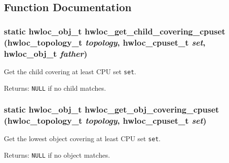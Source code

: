 \subsection{Function Documentation}
\hypertarget{group__hwlocality__helper__find__covering_ge5124e202a86121b45c28ac6d67b5e5b}{
\subsubsection[{hwloc\_\-get\_\-child\_\-covering\_\-cpuset}]{\setlength{\rightskip}{0pt plus 5cm}static {\bf hwloc\_\-obj\_\-t} hwloc\_\-get\_\-child\_\-covering\_\-cpuset ({\bf hwloc\_\-topology\_\-t} {\em topology}, \/  {\bf hwloc\_\-cpuset\_\-t} {\em set}, \/  {\bf hwloc\_\-obj\_\-t} {\em father})}}
\label{group__hwlocality__helper__find__covering_ge5124e202a86121b45c28ac6d67b5e5b}


Get the child covering at least CPU set {\tt set}. 

\begin{Desc}
\item[Returns:]{\tt NULL} if no child matches. \end{Desc}
\hypertarget{group__hwlocality__helper__find__covering_gbbbc2201adff148989b2faf532de3a5f}{
\subsubsection[{hwloc\_\-get\_\-obj\_\-covering\_\-cpuset}]{\setlength{\rightskip}{0pt plus 5cm}static {\bf hwloc\_\-obj\_\-t} hwloc\_\-get\_\-obj\_\-covering\_\-cpuset ({\bf hwloc\_\-topology\_\-t} {\em topology}, \/  {\bf hwloc\_\-cpuset\_\-t} {\em set})}}
\label{group__hwlocality__helper__find__covering_gbbbc2201adff148989b2faf532de3a5f}


Get the lowest object covering at least CPU set {\tt set}. 

\begin{Desc}
\item[Returns:]{\tt NULL} if no object matches. \end{Desc}
